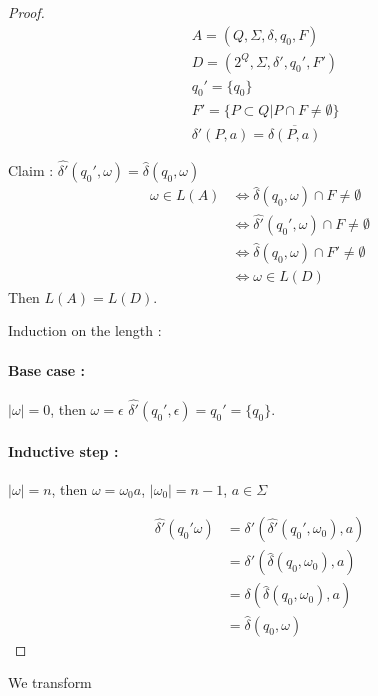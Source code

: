 \documentclass[a4paper,11pt]{article}
\begin{document}
\begin{proof}
  \begin{align*}
    & A = (Q,\Sigma,\delta,q_0,F) \\
    & D = (2^Q,\Sigma,\delta',q_0',F') \\
    & q_0' = \{q_0\} \\
    & F' = \{P \subset Q | P \cap F \neq \emptyset\} \\
    & \delta'(P,a) = \overline{\delta(P,a)}
  \end{align*}

  Claim : $\widehat{\delta'}(q_0',\omega) = \widehat{\delta}(q_0,\omega)$
  \begin{align*}
    \omega \in L(A) &\iff \widehat{\delta}(q_0,\omega) \cap F \neq \emptyset \\
                    &\iff \widehat{\delta'}(q_0',\omega) \cap F \neq \emptyset \\
                    &\iff \widehat{\delta}(q_0,\omega) \cap F' \neq \emptyset \\
                    &\iff \omega \in L(D)
  \end{align*}
  Then $L(A) = L(D)$.

  Induction on the length :

  \paragraph{Base case : } $|\omega| = 0$, then $\omega = \epsilon$
  $\widehat{\delta'}(q_0',\epsilon) = q_0' = \{q_0\}$.
  
  \paragraph{Inductive step : } $|\omega| = n$, then $\omega = \omega_0 a$,
  $|\omega_0| = n-1$, $a \in \Sigma$

  \begin{align*}
    \widehat{\delta'}(q_0'\omega) &= \delta'(\widehat{\delta'}(q_0',\omega_0),a) \\
                                  &= \delta'(\widehat{\delta}(q_0,\omega_0),a) \\
                                  &= \delta(\widehat{\delta}(q_0,\omega_0),a) \\
                                  &= \widehat{\delta}(q_0,\omega)
  \end{align*}
\end{proof}

We transform
\end{document}
